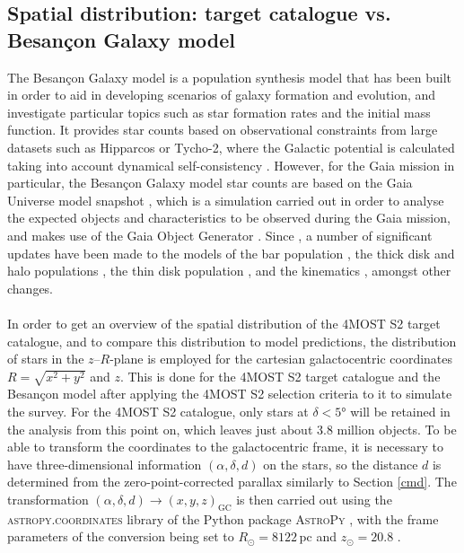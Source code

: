 \documentclass[a4paper,11pt]{article}
\begin{document}
\subsection{Spatial distribution: target catalogue vs. Besan\c{c}on Galaxy model}\label{spatdistr}
The Besan\c{c}on Galaxy model is a population synthesis model that has been built in order to aid in developing scenarios of galaxy formation and evolution, and investigate particular topics such as star formation rates and the initial mass function. It provides star counts based on observational constraints from large datasets such as Hipparcos or Tycho-2, where the Galactic potential is calculated taking into account dynamical self-consistency \citep{besancon1,besancon2}. However, for the Gaia mission in particular, the Besan\c{c}on Galaxy model star counts are based on the Gaia Universe model snapshot \citep[GUMS;][]{gums}, which is a simulation carried out in order to analyse the expected objects and characteristics to be observed during the Gaia mission, and makes use of the Gaia Object Generator \citep[GOG;][]{gog}. Since \citet{besancon1}, a number of significant updates have been made to the models of the bar population \citep{robin12}, the thick disk and halo populations \citep{robin14}, the thin disk population \citep{besancon2}, and the kinematics \citep{robin17}, amongst other changes.\\ \\
%
In order to get an overview of the spatial distribution of the 4MOST S2 target catalogue, and to compare this distribution to model predictions, the distribution of stars in the $z$--$R$-plane is employed for the cartesian galactocentric coordinates $R=\sqrt{x^2+y^2}$ and $z$. This is done for the 4MOST S2 target catalogue and the Besan\c{c}on model after applying the 4MOST S2 selection criteria to it to simulate the survey. For the 4MOST S2 catalogue, only stars at $\delta<5$° will be retained in the analysis from this point on, which leaves just about 3.8 million objects. To be able to transform the coordinates to the galactocentric frame, it is necessary to have three-dimensional information $(\alpha,\delta,d)$ on the stars, so the distance $d$ is determined from the zero-point-corrected parallax similarly to Section \ref{cmd}. The transformation $(\alpha,\delta,d)\rightarrow(x,y,z)_\mathrm{GC}$ is then carried out using the \textsc{astropy.coordinates} library of the Python package \textsc{AstroPy} \citep{astropy1,astropy2,astropy3}, with the frame parameters of the conversion being set to $R_\odot=8122$\,pc \citep{gravity} and $z_\odot=20.8$ \citep{bennett19}.\\ \\
\end{document}
